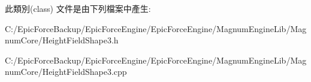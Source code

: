 此類別(class) 文件是由下列檔案中產生\+:\begin{DoxyCompactItemize}
\item 
C\+:/\+Epic\+Force\+Backup/\+Epic\+Force\+Engine/\+Epic\+Force\+Engine/\+Magnum\+Engine\+Lib/\+Magnum\+Core/Height\+Field\+Shape3.\+h\item 
C\+:/\+Epic\+Force\+Backup/\+Epic\+Force\+Engine/\+Epic\+Force\+Engine/\+Magnum\+Engine\+Lib/\+Magnum\+Core/Height\+Field\+Shape3.\+cpp\end{DoxyCompactItemize}

